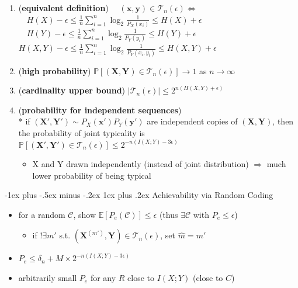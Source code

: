 \documentclass[10pt, landscape]{article}
\makeatletter
\renewcommand{\subsubsection}{\@startsection{subsubsection}{3}{0mm}%
  {-1ex plus -.5ex minus -.2ex}%
  {1ex plus .2ex}%
{\normalfont\small\bfseries}}%
\makeatother
\begin{document}
\begin{multicols*}{4}
  \begin{enumerate}
    \item (\textbf{equivalent definition}) $\quad(\mathbf{x}, \mathbf{y}) \in \mathcal{T}_n(\epsilon) \iff $
      $\quad H(X) - \epsilon \leq \frac{1}{n} \sum^n_{i=1} \log_2 \frac{1}{P_X(x_i)} \leq H(X) + \epsilon$
      $\quad H(Y) - \epsilon \leq \frac{1}{n} \sum^n_{i=1} \log_2 \frac{1}{P_Y(y_i)} \leq H(Y) + \epsilon$
      $H(X, Y) - \epsilon \leq \frac{1}{n} {\displaystyle{\sum^n_{i=1}}} \log_2 \frac{1}{P_Y(x_i, y_i)} \leq H(X, Y) + \epsilon$

    \item (\textbf{high probability})
      $\mathbb{P}[(\mathbf{X}, \mathbf{Y}) \in \mathcal{T}_n(\epsilon)] \to 1$ as $n \to \infty$
    \item (\textbf{cardinality upper bound})
      \( {\displaystyle{ \vert \mathcal{T}_n(\epsilon) \vert \leq 2^{n(H(X,Y)+\epsilon)} }} \) 
    \item (\textbf{probability for independent sequences}) \\*
      if $(\mathbf{X}', \mathbf{Y}') \sim P_X(\mathbf{x}')P_Y(\mathbf{y}')$ are independent copies of  $(\mathbf{X}, \mathbf{Y})$, then the probability of joint typicality is 
      $\mathbb{P}[(\mathbf{X}', \mathbf{Y}') \in \mathcal{T}_n(\epsilon)] \leq 2^{-n(I(X;Y)-3\epsilon)}$
      \begin{itemize}
        \item X and Y drawn independently (instead of joint distribution) $\Rightarrow$ much lower probability of being typical
      \end{itemize}
  \end{enumerate}

  \subsubsection{Achievability via Random Coding}

  \begin{itemize}
    \item for a random $\mathcal{C}$, show $\mathbb{E}[P_e(\mathcal{C})] \leq \epsilon$ 
      (thus $\exists \mathcal{C}$ with $P_e \leq \epsilon$)
      \begin{itemize}
        \item if $!\exists m'$ s.t. $(\mathbf{X}^{(m')}, \mathbf{Y}) \in \mathcal{T}_n(\epsilon)$, set $\hat{m} = m'$
      \end{itemize}
      \item \( {\displaystyle{ P_e \leq \delta_n + M \times 2^{-n(I(X;Y) - 3\epsilon)}  }} \) 
      \item arbitrarily small $P_e$ for any $R$ close to $I(X;Y)$ (close to $C$)
  \end{itemize}


\end{multicols*}
\end{document}
